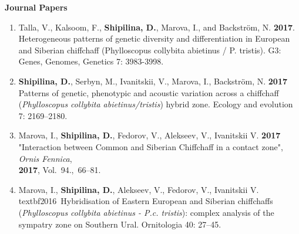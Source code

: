 \documentclass[10pt]{article}
\begin{document}
\begin{cv}
\textbf{\quad Journal Papers}
	
	\begin{enumerate}%
	\item Talla, V., Kalsoom, F., \textbf{Shipilina, D.}, Marova, I., and Backström, N. \textbf{2017}. 
	Heterogeneous patterns of genetic diversity and differentiation in European and Siberian chiffchaff (Phylloscopus collybita abietinus / P. tristis). G3: Genes, Genomes, Genetics 7: 3983-3998.
	 \item  \textbf{Shipilina, D.}, Serbyn, M., Ivanitskii, V., Marova, I., Backström, N. \textbf{2017}\\
	        Patterns of genetic, phenotypic and acoustic variation across a chiffchaff (\textit{Phylloscopus collybita abietinus/tristis}) hybrid zone. Ecology and evolution 7: 2169--2180.        
	 \item  Marova, I., \textbf{Shipilina, D.}, Fedorov, V., Alekseev, V., Ivanitskii V. \textbf{2017}\\
	         "Interaction between Common and Siberian Chiffchaff in a contact zone",  \textit{Ornis Fennica},\\ \textbf{2017}, Vol.~94.,~66--81.
	         
		\item Marova, I., \textbf{Shipilina, D.}, Alekseev, V., Fedorov, V., Ivanitskii V.\\textbf{2016}\
		Hybridisation of Eastern European and Siberian chiffchaffs (\textit{Phylloscopus collybita abietinus - P.c. tristis}): complex analysis of the sympatry zone on Southern Ural. Ornitologia 40: 27--45. %


\end{enumerate}
\end{cv}
\end{document}
